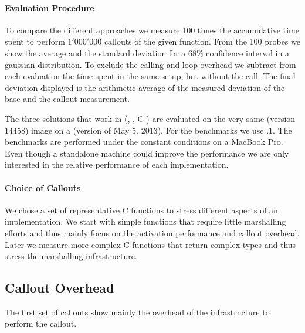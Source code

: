 \paragraph{Evaluation Procedure}
To compare the different \FFI approaches we measure 100 times the accumulative time spent to perform $1'000'000$ callouts of the given function.
From the 100 probes we show the average and the standard deviation for a $68\%$ confidence interval in a gaussian distribution.
To exclude the calling and loop overhead we subtract from each evaluation the time spent in the same setup, but without the \FFI call.
The final deviation displayed is the arithmetic average of the measured deviation of the base and the callout measurement.

The three \FFI solutions that work in \PH (\NB, \Alien, C-\FFI) are evaluated on the very same  (version 14458) image on a \PH \VM (version of May 5. 2013).
For the \Lua benchmarks we use .1.
The benchmarks are performed under the constant conditions on a MacBook Pro.
Even though a standalone machine could improve the performance we are only interested in the relative performance of each implementation.


\paragraph{Choice of Callouts}
We chose a set of representative C functions to stress different aspects of an \FFI implementation.
We start with simple functions that require little marshalling efforts and thus mainly focus on the activation performance and callout overhead.
Later we measure more complex C functions that return complex types and thus stress the marshalling infrastructure.

\subsection{Callout Overhead}

The first set of \FFI callouts show mainly the overhead of the \FFI infrastructure to perform the callout.

